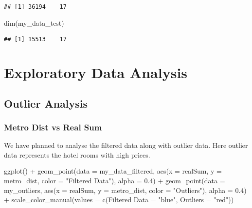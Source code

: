 \documentclass[
]{article}
\newenvironment{Shaded}{\begin{snugshade}}{\end{snugshade}}
\newcommand{\AttributeTok}[1]{\textcolor[rgb]{0.77,0.63,0.00}{#1}}
\newcommand{\FloatTok}[1]{\textcolor[rgb]{0.00,0.00,0.81}{#1}}
\newcommand{\FunctionTok}[1]{\textcolor[rgb]{0.00,0.00,0.00}{#1}}
\newcommand{\NormalTok}[1]{#1}
\newcommand{\OtherTok}[1]{\textcolor[rgb]{0.56,0.35,0.01}{#1}}
\newcommand{\SpecialCharTok}[1]{\textcolor[rgb]{0.00,0.00,0.00}{#1}}
\newcommand{\StringTok}[1]{\textcolor[rgb]{0.31,0.60,0.02}{#1}}
\begin{document}
\begin{verbatim}
## [1] 36194    17
\end{verbatim}

\begin{Shaded}
\begin{Highlighting}[]
\FunctionTok{dim}\NormalTok{(my\_data\_test)}
\end{Highlighting}
\end{Shaded}

\begin{verbatim}
## [1] 15513    17
\end{verbatim}

\hypertarget{exploratory-data-analysis}{%
\section{Exploratory Data Analysis}\label{exploratory-data-analysis}}

\hypertarget{outlier-analysis}{%
\subsection{Outlier Analysis}\label{outlier-analysis}}

\hypertarget{metro-dist-vs-real-sum}{%
\subsubsection{Metro Dist vs Real Sum}\label{metro-dist-vs-real-sum}}

We have planned to analyse the filtered data along with outlier data.
Here outlier data represents the hotel rooms with high prices.

\begin{Shaded}
\begin{Highlighting}[]
\FunctionTok{ggplot}\NormalTok{() }\SpecialCharTok{+} \FunctionTok{geom\_point}\NormalTok{(}\AttributeTok{data =}\NormalTok{ my\_data\_filtered, }\FunctionTok{aes}\NormalTok{(}\AttributeTok{x =}\NormalTok{ realSum,}
    \AttributeTok{y =}\NormalTok{ metro\_dist, }\AttributeTok{color =} \StringTok{"Filtered Data"}\NormalTok{), }\AttributeTok{alpha =} \FloatTok{0.4}\NormalTok{) }\SpecialCharTok{+}
    \FunctionTok{geom\_point}\NormalTok{(}\AttributeTok{data =}\NormalTok{ my\_outliers, }\FunctionTok{aes}\NormalTok{(}\AttributeTok{x =}\NormalTok{ realSum, }\AttributeTok{y =}\NormalTok{ metro\_dist,}
        \AttributeTok{color =} \StringTok{"Outliers"}\NormalTok{), }\AttributeTok{alpha =} \FloatTok{0.4}\NormalTok{) }\SpecialCharTok{+} \FunctionTok{scale\_color\_manual}\NormalTok{(}\AttributeTok{values =} \FunctionTok{c}\NormalTok{(}\StringTok{\textasciigrave{}}\AttributeTok{Filtered Data}\StringTok{\textasciigrave{}} \OtherTok{=} \StringTok{"blue"}\NormalTok{,}
    \AttributeTok{Outliers =} \StringTok{"red"}\NormalTok{))}
\end{Highlighting}
\end{Shaded}
\end{document}
